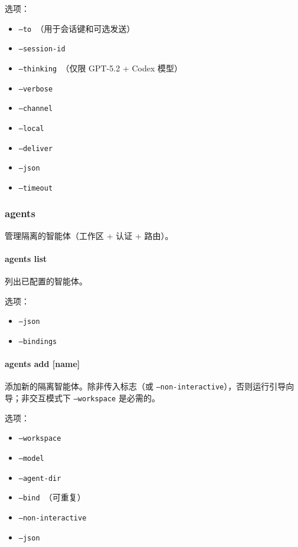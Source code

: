 选项：

\begin{itemize}
  \item \texttt{--to }（用于会话键和可选发送）
  \item \texttt{--session-id }
  \item \texttt{--thinking }（仅限 GPT-5.2 + Codex 模型）
  \item \texttt{--verbose }
  \item \texttt{--channel }
  \item \texttt{--local}
  \item \texttt{--deliver}
  \item \texttt{--json}
  \item \texttt{--timeout }
\end{itemize}


\subsubsection{agents}


管理隔离的智能体（工作区 + 认证 + 路由）。

\paragraph{agents list}


列出已配置的智能体。

选项：

\begin{itemize}
  \item \texttt{--json}
  \item \texttt{--bindings}
\end{itemize}


\paragraph{agents add [name]}


添加新的隔离智能体。除非传入标志（或 \texttt{--non-interactive}），否则运行引导向导；非交互模式下 \texttt{--workspace} 是必需的。

选项：

\begin{itemize}
  \item \texttt{--workspace }
  \item \texttt{--model }
  \item \texttt{--agent-dir }
  \item \texttt{--bind }（可重复）
  \item \texttt{--non-interactive}
  \item \texttt{--json}
\end{itemize}


